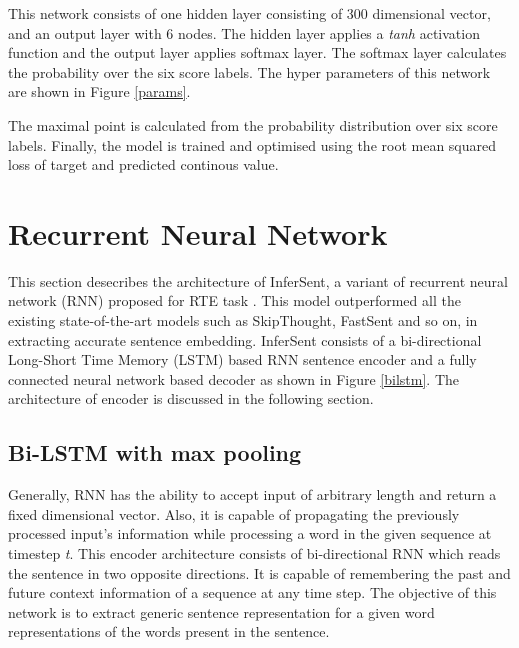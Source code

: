 \documentclass[12pt]{report} %
\begin{document}
	 This network consists of one hidden layer consisting of 300 dimensional vector, and an output layer with 6 nodes. The hidden layer applies a \textit{tanh} activation function and the output layer applies softmax layer. The softmax layer calculates the probability over the six score labels. The hyper parameters of this network are shown in Figure \ref{params}.
	 
	 The maximal point is calculated from the probability distribution over six score labels. Finally, the model is trained and optimised using the root mean squared loss of target and predicted continous value. 
	 
	 \section{Recurrent Neural Network}
	 This section desecribes the architecture of InferSent, a variant of recurrent neural network (RNN) proposed for RTE task \citep{conneau2017supervised}. This model outperformed all the existing state-of-the-art models such as SkipThought, FastSent and so on, in extracting accurate sentence embedding. InferSent consists of a bi-directional Long-Short Time Memory (LSTM) based RNN sentence encoder and a fully connected neural network based decoder as shown in Figure \ref{bilstm}. The architecture of encoder is discussed in the following section. 
	 
	\subsection{Bi-LSTM with max pooling}
	Generally, RNN has the ability to accept input of arbitrary length and return a fixed dimensional vector. Also, it is capable of propagating the previously processed input's information while processing a word in the given sequence at timestep \textit{t}.
	This encoder architecture consists of bi-directional RNN which reads the sentence in two opposite directions. It is capable of remembering the past and future context information of a sequence at any time step. The objective of this network is to extract generic sentence representation for a given word representations of the words present in the sentence.  
	
\end{document}

